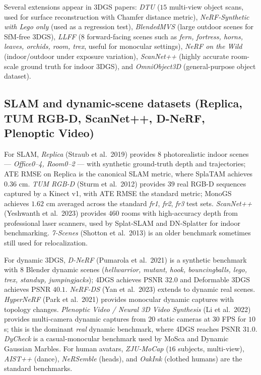 \documentclass{article}
\begin{document}
Several extensions appear in 3DGS papers: \emph{DTU} (\(15\) multi-view object scans, used for surface reconstruction with Chamfer distance metric), \emph{NeRF-Synthetic with Lego only} (used as a regression test), \emph{BlendedMVS} (large outdoor scenes for SfM-free 3DGS), \emph{LLFF} (\(8\) forward-facing scenes such as \emph{fern, fortress, horns, leaves, orchids, room, trex}, useful for monocular settings), \emph{NeRF on the Wild} (indoor/outdoor under exposure variation), \emph{ScanNet++} (highly accurate room-scale ground truth for indoor 3DGS), and \emph{OmniObject3D} (general-purpose object dataset).

\subsection{SLAM and dynamic-scene datasets (Replica, TUM RGB-D, ScanNet++, D-NeRF, Plenoptic Video)}\label{slam-and-dynamic-scene-datasets-replica-tum-rgb-d-scannet-d-nerf-plenoptic-video}

For SLAM, \emph{Replica} (Straub et al.~2019) provides \(8\) photorealistic indoor scenes --- \emph{Office0--4, Room0--2} --- with synthetic ground-truth depth and trajectories; ATE RMSE on Replica is the canonical SLAM metric, where SplaTAM achieves \(0.36\) cm. \emph{TUM RGB-D} (Sturm et al.~2012) provides \(39\) real RGB-D sequences captured by a Kinect v1, with ATE RMSE the standard metric; MonoGS achieves \(1.62\) cm averaged across the standard \emph{fr1}, \emph{fr2}, \emph{fr3} test sets. \emph{ScanNet++} (Yeshwanth et al.~2023) provides \(460\) rooms with high-accuracy depth from professional laser scanners, used by Splat-SLAM and DN-Splatter for indoor benchmarking. \emph{7-Scenes} (Shotton et al.~2013) is an older benchmark sometimes still used for relocalization.

For dynamic 3DGS, \emph{D-NeRF} (Pumarola et al.~2021) is a synthetic benchmark with \(8\) Blender dynamic scenes (\emph{hellwarrior, mutant, hook, bouncingballs, lego, trex, standup, jumpingjacks}); 4DGS achieves PSNR \(32.0\) and Deformable 3DGS achieves PSNR \(40.1\). \emph{NeRF-DS} (Yan et al.~2023) extends to dynamic real scenes. \emph{HyperNeRF} (Park et al.~2021) provides monocular dynamic captures with topology changes. \emph{Plenoptic Video / Neural 3D Video Synthesis} (Li et al.~2022) provides multi-camera dynamic captures from \(20\) static cameras at \(30\) FPS for \(10\) s; this is the dominant \emph{real} dynamic benchmark, where 4DGS reaches PSNR \(31.0\). \emph{DyCheck} is a casual-monocular benchmark used by MoSca and Dynamic Gaussian Marbles. For human avatars, \emph{ZJU-MoCap} (\(16\) subjects, multi-view), \emph{AIST++} (dance), \emph{NeRSemble} (heads), and \emph{OakInk} (clothed humans) are the standard benchmarks.
\end{document}
